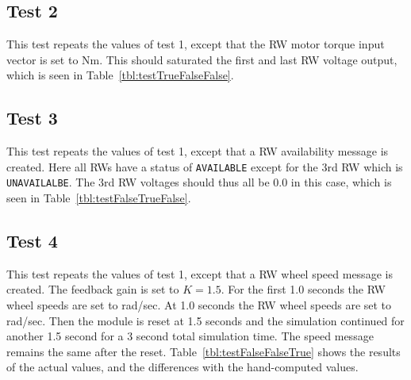 \documentclass[]{BasiliskReportMemo}
\begin{document}


\subsection{Test 2}
This test repeats the values of test 1, except that the RW motor torque input vector is set to  Nm.  This should saturated the first and last RW voltage output, which is seen in Table~\ref{tbl:testTrueFalseFalse}. 



\subsection{Test 3}
This test repeats the values of test 1, except that a RW availability message is created.  Here all RWs have a status of {\tt AVAILABLE} except for the 3rd RW which is {\tt UNAVAILALBE}.    The 3rd RW voltages should thus all be 0.0 in this case, which is seen in Table~\ref{tbl:testFalseTrueFalse}. 



\subsection{Test 4}

This test repeats the values of test 1, except that a RW wheel speed message is created.  The feedback gain is set to $K = 1.5$.  For the first 1.0 seconds the RW wheel speeds are set to  rad/sec.  At 1.0 seconds the RW wheel speeds are set to   rad/sec.  Then the module is reset at 1.5 seconds and the simulation continued for another 1.5 second for a 3 second total simulation time.   The speed message remains the same after the reset.   Table~\ref{tbl:testFalseFalseTrue} shows the results of the actual values, and the differences with the hand-computed values.  


\end{document}
